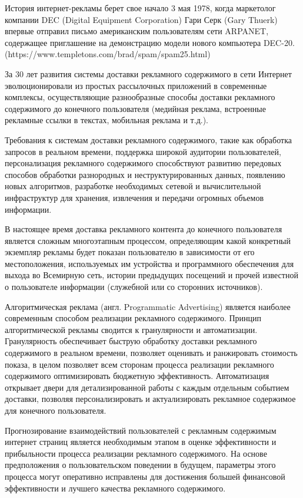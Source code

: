 
История интернет-рекламы берет свое начало 3 мая 1978, когда маркетолог компании DEC (Digital Equipment Corporation) 
Гари Серк (Gary Thuerk) впервые отправил письмо американским пользователям сети ARPANET, содержащее приглашение
на демонстрацию модели нового компьютера DEC-20. (https://www.templetons.com/brad/spam/spam25.html)

За 30 лет развития системы доставки рекламного содержимого в сети Интернет эволюционировали из простых рассылочных
приложений в современные комплексы, осуществляющие разнообразные способы доставки рекламного содержимого до 
конечного пользователя (медийная реклама, встроенные рекламные ссылки в текстах, мобильная реклама и т.д.).

Требования к системам доставки рекламного содержимого, такие как обработка запросов в реальном времени, 
поддержка широкой аудитории пользователей, персонализация рекламного содержимого способствуют развитию
передовых способов обработки разнородных и неструктурированных данных, появлению новых алгоритмов, разработке
необходимых сетевой и вычислительной инфраструктур для хранения, извлечения и передачи огромных объемов информации.

В настоящее время доставка рекламного контента до конечного пользователя является сложным многоэтапным процессом, 
определяющим какой конкретный экземпляр рекламы будет показан пользователю в зависимости от его местоположения,
используемых им устройства и программного обеспечения для выхода во Всемирную сеть, истории предыдущих
посещений и прочей известной о пользователе информации (служебной или со сторонних источников).

Алгоритмическая реклама (англ. Programmatic Advertising) является наиболее современным способом реализации 
рекламного содержимого. Принцип алгоритмической рекламы сводится к гранулярности и автоматизации. Гранулярность
обеспечивает быструю обработку доставки рекламного содержимого в реальном времени, позволяет оценивать и ранжировать
стоимость показа, в целом позволяет всем сторонам процесса реализации рекламного содержимого оптимизировать бюджетную
эффективность. Автоматизация открывает двери для детализированной работы с каждым отдельным событием доставки,
позволяя персонализировать и актуализировать рекламное содержимое для конечного пользователя.

Прогнозирование взаимодействий пользователей с рекламным содержимым интернет страниц является необходимым этапом
в оценке эффективности и прибыльности процесса реализации рекламного содержимого. На основе предположения о 
пользовательском поведении в будущем, параметры этого процесса могут оперативно исправлены для достижения большей
финансовой эффективности и лучшего качества рекламного содержимого.

